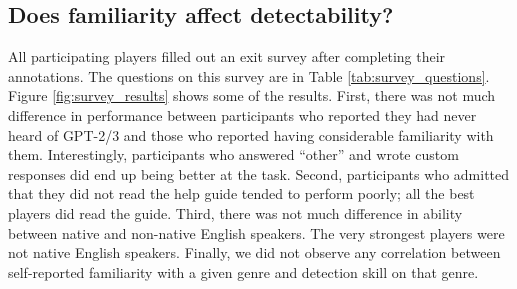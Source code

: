 \subsection{Does familiarity affect detectability?}
All participating players filled out an exit survey after completing their annotations. The questions on this survey are in Table \ref{tab:survey_questions}.
Figure \ref{fig:survey_results} shows some of the results.
First, there was not much difference in performance between participants who reported they had never heard of GPT-2/3 and those who reported having considerable familiarity with them.
Interestingly, participants who answered ``other'' and wrote custom responses did end up being better at the task.
Second, participants who admitted that they did not read the help guide tended to perform poorly; all the best players did read the guide.
Third, there was not much difference in ability between native and non-native English speakers.
The very strongest players were not native English speakers.
Finally, we did not observe any correlation between self-reported familiarity with a given genre and detection skill on that genre.

